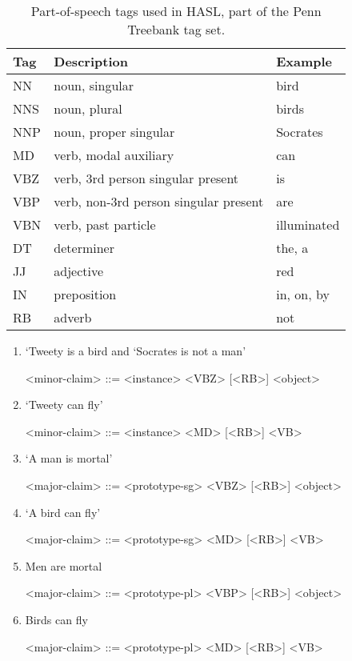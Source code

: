 \begin{table}
    \begin{tabular}{lll}
        Tag & Description & Example \\
        \hline
        NN  & noun, singular & bird \\
        NNS & noun, plural & birds \\
        NNP & noun, proper singular & Socrates \\
        MD  & verb, modal auxiliary & can \\
        VBZ & verb, 3rd person singular present & is \\
        VBP & verb, non-3rd person singular present & are \\
        VBN & verb, past particle & illuminated \\
        DT  & determiner & the, a \\
        JJ  & adjective & red \\
        IN  & preposition & in, on, by \\
        RB  & adverb & not
    \end{tabular}
    \caption{Part-of-speech tags used in HASL, part of the Penn Treebank tag set.}
    \label{table:postags}
\end{table}

\begin{enumerate}
    \item `Tweety is a bird and `Socrates is not a man'
    \begin{grammar}
        <minor-claim> ::= <instance> <VBZ> [<RB>] <object>
    \end{grammar}
    \item `Tweety can fly'
    \begin{grammar}
        <minor-claim> ::= <instance> <MD> [<RB>] <VB>
    \end{grammar}

    \item `A man is mortal'
    \begin{grammar}
        <major-claim> ::= <prototype-sg> <VBZ> [<RB>] <object>
    \end{grammar}
    \item `A bird can fly'
    \begin{grammar}
        <major-claim> ::= <prototype-sg> <MD> [<RB>] <VB>
    \end{grammar}
    \item Men are mortal
    \begin{grammar}
        <major-claim> ::= <prototype-pl> <VBP> [<RB>] <object>
    \end{grammar}
    \item Birds can fly
    \begin{grammar}
        <major-claim> ::= <prototype-pl> <MD> [<RB>] <VB>
    \end{grammar}
\end{enumerate}

